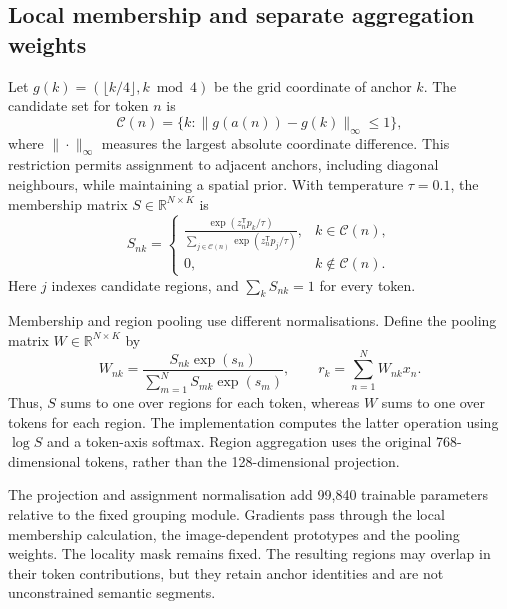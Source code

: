 \subsection{Local membership and separate aggregation weights}

Let $g(k)=(\lfloor k/4\rfloor,k\bmod4)$ be the grid coordinate of anchor $k$.
The candidate set for token $n$ is
\begin{equation}
 \mathcal{C}(n)=
 \{k:\|g(a(n))-g(k)\|_{\infty}\leq1\},
 \label{eq:local-candidates}
\end{equation}
where $\|\cdot\|_{\infty}$ measures the largest absolute coordinate difference.
This restriction permits assignment to adjacent anchors, including diagonal
neighbours, while maintaining a spatial prior. With temperature $\tau=0.1$,
the membership matrix $S\in\mathbb{R}^{N\times K}$ is
\begin{equation}
 S_{nk}=
 \begin{cases}
 \displaystyle\frac{\exp(z_n^{\mathsf T}p_k/\tau)}
 {\sum_{j\in\mathcal{C}(n)}\exp(z_n^{\mathsf T}p_j/\tau)},
       & k\in\mathcal{C}(n),\\[0.7em]
 0,    & k\notin\mathcal{C}(n).
 \end{cases}
 \label{eq:membership}
\end{equation}
Here $j$ indexes candidate regions, and $\sum_k S_{nk}=1$ for every token.

Membership and region pooling use different normalisations. Define the pooling
matrix $W\in\mathbb{R}^{N\times K}$ by
\begin{equation}
 W_{nk}=\frac{S_{nk}\exp(s_n)}
                {\sum_{m=1}^{N}S_{mk}\exp(s_m)},
 \qquad
 r_k=\sum_{n=1}^{N}W_{nk}x_n.
 \label{eq:soft-pooling}
\end{equation}
Thus, $S$ sums to one over regions for each token, whereas $W$ sums to one over
tokens for each region. The implementation computes the latter operation using
$\log S$ and a token-axis softmax. Region aggregation uses the original
768-dimensional tokens, rather than the 128-dimensional projection.

The projection and assignment normalisation add 99,840 trainable parameters
relative to the fixed grouping module. Gradients pass through the local
membership calculation, the image-dependent prototypes and the pooling
weights. The locality mask remains fixed. The resulting regions may overlap
in their token contributions, but they retain anchor identities and are not
unconstrained semantic segments.

